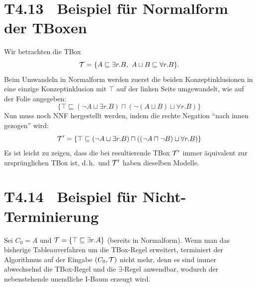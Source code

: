 \documentclass[fontsize=11pt, twoside=false, numbers=autoenddot]{scrbook}
\begin{document}
\pagebreak
\section*{T4.13~ Beispiel für Normalform der TBoxen}

Wir betrachten die TBox
\[
  \mathcal{T} = \{A \sqsubseteq \exists r.B,~ A \sqcup B \sqsubseteq \forall r.B\}.
\]
Beim Umwandeln in Normalform werden zuerst die beiden Konzeptinklusionen
in eine einzige Konzeptinklusion mit $\top$ auf der linken Seite umgewandelt,
wie auf der Folie angegeben:
\[
  \{\top \sqsubseteq (\lnot A \sqcup \exists r.B) \sqcap (\lnot(A \sqcup B) \sqcup \forall r.B)\}
\]
Nun muss noch NNF hergestellt werden, indem die rechte Negation "`nach innen gezogen"' wird:
\[
  \mathcal{T}' = \{\top \sqsubseteq (\lnot A \sqcup \exists r.B) \sqcap ((\lnot A \sqcap \lnot B) \sqcup \forall r.B)\}
\]
Es ist leicht zu zeigen, dass die bei resultierende TBox $\mathcal{T}'$ immer äquivalent zur ursprünglichen TBox \Tmc ist, d.\,h.\ \Tmc und $\mathcal{T}'$ haben dieselben Modelle.

\parbox[t]{.78\linewidth}{%
  \section*{T4.14~ Beispiel für Nicht-Terminierung}

  Sei $C_0 = A$ und $\mathcal{T} = \{\top \sqsubseteq \exists r.A\}$ (bereits in Normalform).
  Wenn man das bisherige Tableau\-verfahren um die TBox-Regel erweitert,
  terminiert der Algorithmus auf der Eingabe $(C_0,\mathcal{T})$ nicht mehr,
  denn es sind immer abwechselnd die TBox-Regel und die $\exists$-Regel anwendbar,
  wodurch der nebenstehende unendliche I-Baum erzeugt wird.
}%
\hfill
\parbox[t]{.14\linewidth}{%
}
\end{document}
